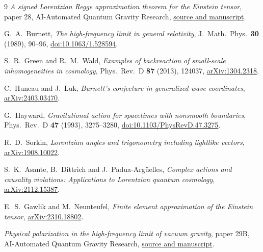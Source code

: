 \documentclass[11pt]{article}
\begin{document}
\begin{thebibliography}{9}
\emph{A signed Lorentzian Regge approximation theorem for the
Einstein tensor}, paper 28, AI-Automated Quantum Gravity Research,
\href{https://github.com/g3173028019-beep/ai-automated-quantum-gravity-research/tree/main/papers/28-lorentzian-regge-einstein-tensor}
{source and manuscript}.

G.~A.~Burnett, \emph{The high-frequency limit in general relativity},
J.~Math.~Phys.~\textbf{30} (1989), 90--96,
\href{https://doi.org/10.1063/1.528594}{doi:10.1063/1.528594}.

S.~R.~Green and R.~M.~Wald,
\emph{Examples of backreaction of small-scale inhomogeneities
in cosmology}, Phys.~Rev.~D \textbf{87} (2013), 124037,
\href{https://arxiv.org/abs/1304.2318}{arXiv:1304.2318}.

C.~Huneau and J.~Luk,
\emph{Burnett's conjecture in generalized wave coordinates},
\href{https://arxiv.org/abs/2403.03470}{arXiv:2403.03470}.

G.~Hayward, \emph{Gravitational action for spacetimes with
nonsmooth boundaries}, Phys.~Rev.~D \textbf{47} (1993), 3275--3280,
\href{https://doi.org/10.1103/PhysRevD.47.3275}
{doi:10.1103/PhysRevD.47.3275}.

R.~D.~Sorkin, \emph{Lorentzian angles and trigonometry including
lightlike vectors}, \href{https://arxiv.org/abs/1908.10022}
{arXiv:1908.10022}.

S.~K.~Asante, B.~Dittrich and J.~Padua-Arg\"uelles,
\emph{Complex actions and causality violations: Applications to
Lorentzian quantum cosmology},
\href{https://arxiv.org/abs/2112.15387}{arXiv:2112.15387}.

E.~S.~Gawlik and M.~Neunteufel,
\emph{Finite element approximation of the Einstein tensor},
\href{https://arxiv.org/abs/2310.18802}{arXiv:2310.18802}.

\emph{Physical polarization in the high-frequency limit of vacuum
gravity}, paper 29B, AI-Automated Quantum Gravity Research,
\href{https://github.com/g3173028019-beep/ai-automated-quantum-gravity-research/tree/main/papers/29b-high-frequency-graviton-polarization}
{source and manuscript}.
\end{thebibliography}
\end{document}
